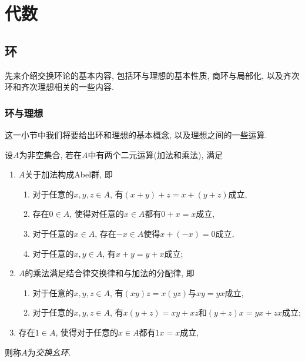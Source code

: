 
\section{代数}

\subsection{环}

先来介绍交换环论的基本内容, 包括环与理想的基本性质, 商环与局部化, 以及齐次环和齐次理想相关的一些内容.

\subsubsection{环与理想}\label{sec:algebra-ringideal}

这一小节中我们将要给出环和理想的基本概念, 以及理想之间的一些运算.

\begin{definition}
  设$A$为非空集合, 若在$A$中有两个二元运算(加法和乘法), 满足
  \begin{enumerate}
    \item $A$关于加法构成Abel群, 即
    \begin{enumerate}
      \item 对于任意的$x, y, z\in A$, 有$(x+y)+z=x+(y+z)$成立,
      \item 存在$0\in A$, 使得对任意的$x\in A$都有$0+x=x$成立,
      \item 对于任意的$x\in A$, 存在$-x\in A$使得$x+(-x)=0$成立,
      \item 对于任意的$x, y\in A$, 有$x+y=y+x$成立;
    \end{enumerate}
    \item $A$的乘法满足结合律交换律和与加法的分配律, 即
    \begin{enumerate}
      \item 对于任意的$x, y, z\in A$, 有$(xy)z=x(yz)$与$xy=yx$成立,
      \item 对于任意的$x, y, z\in A$, 有$x(y+z)=xy+xz$和$(y+z)x=yx+zx$成立;
    \end{enumerate}
    \item 存在$1\in A$, 使得对于任意的$x\in A$都有$1x=x$成立,
  \end{enumerate}
  则称$A$为\emph{交换幺环}.
\end{definition}


